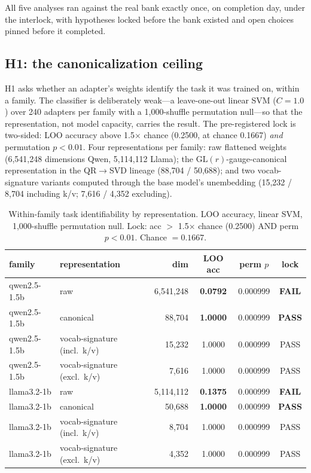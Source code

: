 \documentclass[10pt]{article}
\begin{document}
All five analyses ran against the real bank exactly once, on completion
day, under the interlock, with hypotheses locked before the bank existed
and open choices pinned before it completed.

\subsection{H1: the canonicalization ceiling}
\label{sec:h1}

H1 asks whether an adapter's weights identify the task it was trained on,
within a family. The classifier is deliberately weak---a leave-one-out
linear SVM ($C = 1.0$) over 240 adapters per family with a 1{,}000-shuffle
permutation null---so that the representation, not model capacity, carries
the result. The pre-registered lock is two-sided: LOO accuracy above
1.5$\times$ chance (0.2500, at chance 0.1667) \emph{and} permutation
$p < 0.01$. Four representations per family: raw flattened weights
(6{,}541{,}248 dimensions Qwen, 5{,}114{,}112 Llama); the
$\mathrm{GL}(r)$-gauge-canonical representation in the
QR$\rightarrow$SVD lineage (88{,}704 / 50{,}688); and two vocab-signature
variants computed through the base model's unembedding (15{,}232 / 8{,}704
including k/v; 7{,}616 / 4{,}352 excluding).

\begin{table}[ht]
\centering
\caption{Within-family task identifiability by representation. LOO
accuracy, linear SVM, 1{,}000-shuffle permutation null. Lock: acc $>$
1.5$\times$ chance (0.2500) AND perm $p < 0.01$. Chance $= 0.1667$.}
\label{tab:h1}
\small
\begin{tabular}{llrccc}
\toprule
family & representation & dim & LOO acc & perm $p$ & lock \\
\midrule
qwen2.5-1.5b & raw & 6{,}541{,}248 & \textbf{0.0792} & 0.000999 & \textbf{FAIL} \\
qwen2.5-1.5b & canonical & 88{,}704 & \textbf{1.0000} & 0.000999 & \textbf{PASS} \\
qwen2.5-1.5b & vocab-signature (incl.\ k/v) & 15{,}232 & 1.0000 & 0.000999 & PASS \\
qwen2.5-1.5b & vocab-signature (excl.\ k/v) & 7{,}616 & 1.0000 & 0.000999 & PASS \\
llama3.2-1b & raw & 5{,}114{,}112 & \textbf{0.1375} & 0.000999 & \textbf{FAIL} \\
llama3.2-1b & canonical & 50{,}688 & \textbf{1.0000} & 0.000999 & \textbf{PASS} \\
llama3.2-1b & vocab-signature (incl.\ k/v) & 8{,}704 & 1.0000 & 0.000999 & PASS \\
llama3.2-1b & vocab-signature (excl.\ k/v) & 4{,}352 & 1.0000 & 0.000999 & PASS \\
\bottomrule
\end{tabular}
\end{table}
\end{document}
